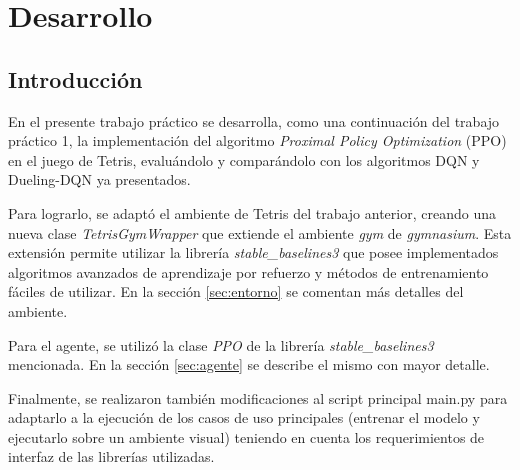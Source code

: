 
\chapter{Desarrollo} %

\label{Chapter1} %
\label{IntroGeneral}


\newcommand{\keyword}[1]{\textbf{#1}}
\newcommand{\tabhead}[1]{\textbf{#1}}
\newcommand{\code}[1]{\texttt{#1}}
\newcommand{\file}[1]{\texttt{\bfseries#1}}
\newcommand{\option}[1]{\texttt{\itshape#1}}
\newcommand{\grados}{$^{\circ}$}



\section{Introducción}

En el presente trabajo práctico se desarrolla, como una continuación del trabajo práctico 1, la implementación del algoritmo \textit{Proximal Policy Optimization} (PPO) en el juego de Tetris, evaluándolo y comparándolo con los algoritmos DQN y Dueling-DQN ya presentados.

Para lograrlo, se adaptó el ambiente de Tetris del trabajo anterior, creando una nueva clase \textit{TetrisGymWrapper} que extiende el ambiente \textit{gym} de \textit{gymnasium}. Esta extensión permite utilizar la librería \textit{stable\_baselines3} que posee implementados algoritmos avanzados de aprendizaje por refuerzo y métodos de entrenamiento fáciles de utilizar. En la sección \ref{sec:entorno} se comentan más detalles del ambiente.

Para el agente, se utilizó la clase \textit{PPO} de la librería \textit{stable\_baselines3} mencionada. En la sección \ref{sec:agente} se describe el mismo con mayor detalle.

Finalmente, se realizaron también modificaciones al script principal main.py para adaptarlo a la ejecución de los casos de uso principales (entrenar el modelo y ejecutarlo sobre un ambiente visual) teniendo en cuenta los requerimientos de interfaz de las librerías utilizadas.

